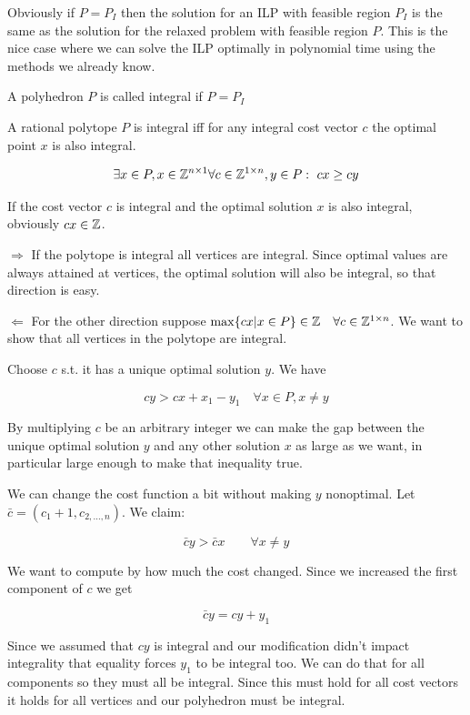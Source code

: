 Obviously if $P=P_I$ then the solution for an ILP with feasible region $P_I$ is the same as the solution for the relaxed problem with feasible region $P$. This is the nice case where we can solve the ILP optimally in polynomial time using the methods we already know.

\begin{Def} A polyhedron $P$ is called integral if $P=P_I$\end{Def}

\begin{thm}\label{Thm:polyIntegrality} A rational polytope $P$ is integral iff for any integral cost vector $c$ the optimal point $x$ is also integral.

\[\exists x\in P,x\in \mathbb{Z}^{n\times 1}\forall c\in \mathbb{Z}^{1\times n}, y \in P:\ cx\geq cy\] 
\end{thm}

If the cost vector $c$ is integral and the optimal solution $x$ is also integral, obviously $cx\in \mathbb{Z}$.

\begin{pr} $\Rightarrow$ If the polytope is integral all vertices are integral. Since optimal values are always attained at vertices, the optimal solution will also be integral, so that direction is easy.

$\Leftarrow$ For the other direction suppose $\max \{cx | x\in P\}\in \mathbb{Z}\quad \forall c\in \mathbb{Z}^{1\times n}$. We want to show that all vertices in the polytope are integral.

Choose $c$ s.t. it has a unique optimal solution $y$. We have 

\[cy>cx + x_1 -y_1 \quad \forall x\in P,x\neq y\]

By multiplying $c$ be an arbitrary integer we can make the gap between the unique optimal solution $y$ and any other solution $x$ as large as we want, in particular large enough to make that inequality true.

We can change the cost function a bit without making $y$ nonoptimal. Let $\bar c = (c_1+1,c_{2,\ldots,n})$. We claim:

\[\bar c y > \bar c x\qquad \forall x\neq y\]

We want to compute by how much the cost changed. Since we increased the first component of $c$ we get

\[\bar c y = cy+y_1\]

Since we assumed that $cy$ is integral and our modification didn't impact integrality that equality forces $y_1$ to be integral too. We can do that for all components so they must all be integral. Since this must hold for all cost vectors it holds for all vertices and our polyhedron must be integral.
\end{pr}

